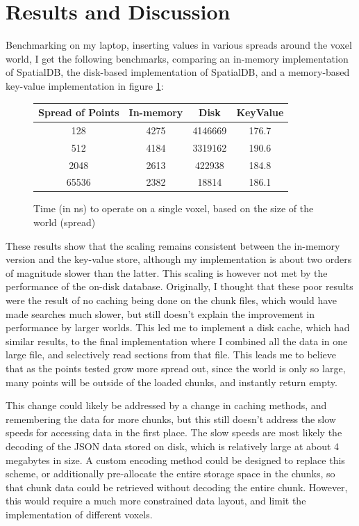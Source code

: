 \documentclass[10pt,twocolumn]{article}
\begin{document}
\section{Results and Discussion}

Benchmarking on my laptop, inserting values in various spreads around the voxel
world, I get the following benchmarks, comparing an in-memory implementation of
SpatialDB, the disk-based implementation of SpatialDB, and a memory-based
key-value implementation in figure \ref{fig:reads}:

\begin{figure}
  \centering
  \begin{tabular}{c | c | c | c}
    Spread of Points & In-memory & Disk & KeyValue\\
    \hline
    128 & 4275 & 4146669 & 176.7\\
    512 & 4184 & 3319162 & 190.6\\
    2048 & 2613 & 422938 & 184.8\\
    65536 & 2382 & 18814 & 186.1
  \end{tabular}
  \caption{Time (in ns) to operate on a single voxel, based on the size of the
  world (spread)}
  \label{fig:reads}
\end{figure}

These results show that the scaling remains consistent between the in-memory
version and the key-value store, although my implementation is about two orders
of magnitude slower than the latter. This scaling is however not met by the
performance of the on-disk database. Originally, I thought that these poor
results were the result of no caching being done on the chunk files, which would
have made searches much slower, but still doesn't explain the improvement in
performance by larger worlds. This led me to implement a disk cache, which had
similar results, to the final implementation where I combined all the data in
one large file, and selectively read sections from that file. This leads me to
believe that as the points tested grow more spread out, since the world is only
so large, many points will be outside of the loaded chunks, and instantly return
empty.

This change could likely be addressed by a change in caching methods, and
remembering the data for more chunks, but this still doesn't address the slow
speeds for accessing data in the first place. The slow speeds are most likely
the decoding of the JSON data stored on disk, which is relatively large at
about 4 megabytes in size. A custom encoding method could be designed to replace
this scheme, or additionally pre-allocate the entire storage space in the
chunks, so that chunk data could be retrieved without decoding the entire chunk.
However, this would require a much more constrained data layout, and limit the
implementation of different voxels.
\end{document}
